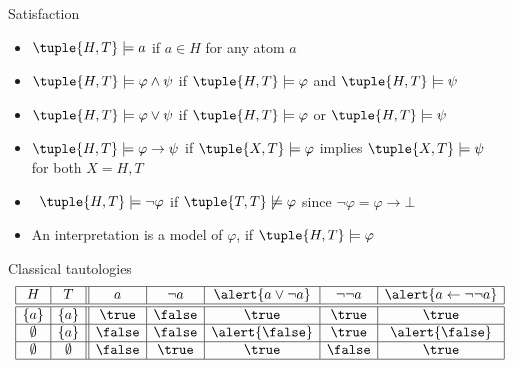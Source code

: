 \begin{frame}{Satisfaction}
  \begin{itemize}
  \item $\tuple{H,T} \models a$ if $a \in H$ \hfill for any atom $a$
  \item $\tuple{H,T} \models \varphi \wedge \psi$ if
    $\tuple{H,T} \models \varphi$
    and
    $\tuple{H,T} \models \psi$
  \item $\tuple{H,T} \models \varphi \vee \psi$ if
    $\tuple{H,T} \models \varphi$
    or
    $\tuple{H,T} \models \psi$

    \smallskip

  \item $\tuple{H,T} \models \varphi \rightarrow \psi$ if
    $\tuple{X,T} \models \varphi$ implies $\tuple{X,T} \models \psi$
    \\\qquad\qquad
    for both $X=H,T$

    \bigskip

  \item<2>  \ $\tuple{H,T} \models \neg\varphi$ if $\tuple{T,T} \not\models \varphi$
    \hfill since $\neg\varphi = \varphi\to\bot$

    \bigskip

  \item<3-> An interpretation  is a \alert{model} of $\varphi$, if $\tuple{H,T} \models \varphi$
  \end{itemize}
\end{frame}
\begin{frame}{Classical tautologies}
\centering
  \[
    \begin{array}{| c | c || c | c | c | c | c |}
      \hline
      H         & T          & a      & \neg a & \alert{a \vee \neg a} & \neg\neg a & \alert{a \leftarrow \neg\neg a}
      \\\hline\hline
      \{ a \}   & \{ a \}    & \true  & \false & \true                 & \true      & \true
      \\\hline
      \emptyset & \{ a \}    & \false & \false & \alert{\false}        & \true      & \alert{\false}
      \\\hline
      \emptyset & \emptyset  & \false & \true  & \true                 & \false     & \true
      \\\hline
    \end{array}
  \]
\end{frame}
